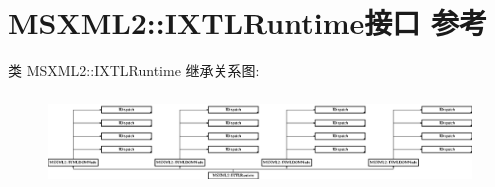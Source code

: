 \hypertarget{interface_m_s_x_m_l2_1_1_i_x_t_l_runtime}{}\section{M\+S\+X\+M\+L2\+:\+:I\+X\+T\+L\+Runtime接口 参考}
\label{interface_m_s_x_m_l2_1_1_i_x_t_l_runtime}
类 M\+S\+X\+M\+L2\+:\+:I\+X\+T\+L\+Runtime 继承关系图\+:\begin{figure}[H]
\begin{center}
\leavevmode
\includegraphics[height=2.485207cm]{interface_m_s_x_m_l2_1_1_i_x_t_l_runtime}
\end{center}
\end{figure}

